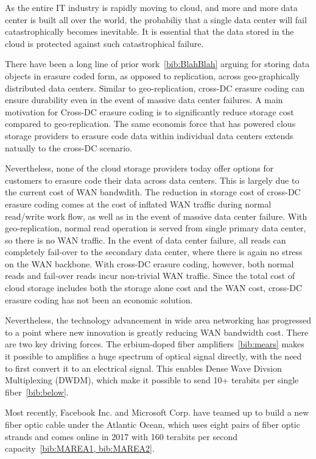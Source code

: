 As the entire IT industry is rapidly moving to cloud, and more and more data center is built all over the world, the probabiliy that a single data center will fail catastrophically becomes inevitable. It is essential that the data stored in the cloud is protected against such catastrophical failure. 

There have been a long line of prior work~\ref{bib:BlahBlah} arguing for storing data objects in erasure coded form, as opposed to replication, across geo-graphically distributed data centers. Similar to geo-replication, cross-DC erasure coding can ensure durability even in the event of massive data center failures. A main motivation for Cross-DC erasure coding is to significantly reduce storage cost compared to geo-replication. The same economis force that has powered clous storage providers to erasure code data within individual data centers extends natually to the cross-DC scenario.

Nevertheless, none of the cloud storage providers today offer options for customers to erasure code their data across data centers. This is largely due to the current cost of WAN bandwdith. The reduction in storage cost of cross-DC erasure coding comes at the cost of inflated WAN traffic during normal read/write work flow, as well as in the event of massive data center failure. With geo-replication, normal read operation is served from single primary data center, so there is no WAN traffic. In the event of data center failure, all reads can completely fail-over to the secondary data center, where there is again no stress on the WAN backbone. With cross-DC erasure coding, however, both normal reads and fail-over reads incur non-trivial WAN traffic. Since the total cost of cloud storage includes both the storage alone cost and the WAN cost, cross-DC erasure coding has not been an economic solution.

Nevertheless, the technology advancement in wide area networking has progressed to a point where new innovation is greatly reducing WAN bandwidth cost. There are two key driving forces. The erbium-doped fiber amplifiers~\ref{bib:mears} makes it possible to amplifies a huge spectrum of optical signal directly, with the need to first convert it to an electrical signal. This enables Dense Wave Divsion Multiplexing (DWDM), which make it possible to send 10+ terabits per single fiber~\ref{bib:below}. 

Most recently, Facebook Inc. and Microsoft Corp. have teamed up to build a new fiber optic cable under the Atlantic Ocean, which uses eight pairs of fiber optic strands and comes online in 2017 with 160 terabits per second capacity~\ref{bib:MAREA1, bib:MAREA2}.

